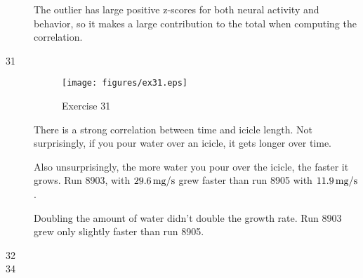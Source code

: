 \documentclass{exam}
\begin{document}
\begin{description}
\begin{parts}
            The outlier has large positive z-scores for both neural activity and
            behavior, so it makes a large contribution to the total when computing
            the correlation.

        \end{parts}

      \item[31]
        \begin{figure}[H]
          \centering
          \texttt{[image: figures/ex31.eps]}
          \caption{Exercise 31}
        \end{figure}

        There is a strong correlation between time and icicle length.  Not surprisingly,
        if you pour water over an icicle, it gets longer over time.

        Also unsurprisingly, the more water you pour over the icicle, the faster it grows.
        Run 8903, with $\unit[29.6]{mg/s}$ grew faster than run 8905 with
        $\unit[11.9]{mg/s}$.

        Doubling the amount of water didn't double the growth rate.  Run 8903 grew only
        slightly faster than run 8905.

      \item[32]

      \item[34]
        \begin{parts}

\end{parts}
\end{description}
\end{document}
